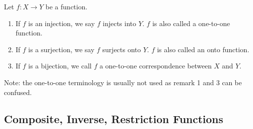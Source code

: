 \begin{remark} Let $f: X \to Y$ be a function. 
\begin{enumerate}
    \item If $f$ is an injection, we say $f$ injects into $Y$. $f$ is also called a one-to-one function.
    \item If $f$ is a surjection, we say $f$ surjects onto $Y$. $f$ is also called an onto function.
    \item If $f$ is a bijection, we call $f$ a one-to-one correspondence between $X$ and $Y$.
\end{enumerate}
\noindent Note: the one-to-one terminology is usually not used as remark 1 and 3 can be confused.
\end{remark}

\subsection{Composite, Inverse, Restriction Functions}

